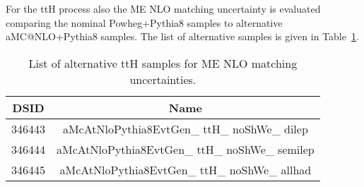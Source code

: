 


For the ttH process also the ME NLO matching uncertainty is evaluated comparing the nominal Powheg+Pythia8 samples to alternative aMC@NLO+Pythia8 samples. The list of alternative samples is given in Table~\ref{sec:systs:tab:systematics_singleHiggssamples_ttH_MENLO}.

\begin{table}
\centering
\begin{tabular}{|c|c|}
\hline
DSID & Name\\
\hline
346443 & aMcAtNloPythia8EvtGen\_ ttH\_ noShWe\_ dilep\\
346444 & aMcAtNloPythia8EvtGen\_ ttH\_ noShWe\_ semilep\\
346445 & aMcAtNloPythia8EvtGen\_ ttH\_ noShWe\_ allhad\\
\hline
\end{tabular}
\caption{List of alternative ttH samples for ME NLO matching uncertainties.}
\label{sec:systs:tab:systematics_singleHiggssamples_ttH_MENLO}
\end{table}

